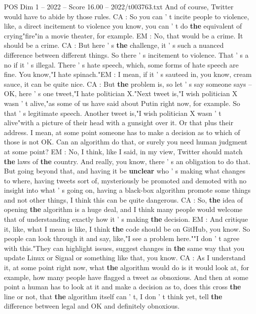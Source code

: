 \begin{textsample}{POS Dim 1 – 2022 – Score 16.00 – 2022/t003763.txt}
And of course, Twitter would have to abide by those rules.
CA : So you can ' t incite people to violence, like, a direct incitement to violence you know, you can ' t do \textbf{the} equivalent of crying"fire"in a movie theater, for example.
EM : No, that would be a crime.
It should be a crime.
CA : But here ' s \textbf{the} challenge, it ' s such a nuanced difference between different things.
So there ' s incitement to violence.
That ' s a no if it ' s illegal.
There ' s hate speech, which, some forms of hate speech are fine.
You know,"I hate spinach."EM : I mean, if it ' s sauteed in, you know, cream sauce, it can be quite nice.
CA : But \textbf{the} problem is, so let ' s say someone says -- OK, here ' s one tweet,"I hate politician X."Next tweet is,"I wish politician X wasn ' t alive,"as some of us have said about Putin right now, for example.
So that ' s legitimate speech.
Another tweet is,"I wish politician X wasn ' t alive"with a picture of their head with a gunsight over it.
Or that plus their address.
I mean, at some point someone has to make a decision as to which of those is not OK.
Can an algorithm do that, or surely you need human judgment at some point?
EM : No, I think, like I said, in my view, Twitter should match \textbf{the} laws of \textbf{the} country.
And really, you know, there ' s an obligation to do that.
But going beyond that, and having it be \textbf{unclear} who ' s making what changes to where, having tweets sort of, mysteriously be promoted and demoted with no insight into what ' s going on, having a black-box algorithm promote some things and not other things, I think this can be quite dangerous.
CA : So, \textbf{the} idea of opening \textbf{the} algorithm is a huge deal, and I think many people would welcome that of understanding exactly how it ' s making \textbf{the} decision.
EM : And critique it, like, what I mean is like, I think \textbf{the} code should be on GitHub, you know.
So people can look through it and say, like,"I see a problem here.""I don ' t agree with this."They can highlight issues, suggest changes in \textbf{the} same way that you update Linux or Signal or something like that, you know.
CA : As I understand it, at some point right now, what \textbf{the} algorithm would do is it would look at, for example, how many people have flagged a tweet as obnoxious.
And then at some point a human has to look at it and make a decision as to, does this cross \textbf{the} line or not, that \textbf{the} algorithm itself can ' t, I don ' t think yet, tell \textbf{the} difference between legal and OK and definitely obnoxious.

\end{textsample}
